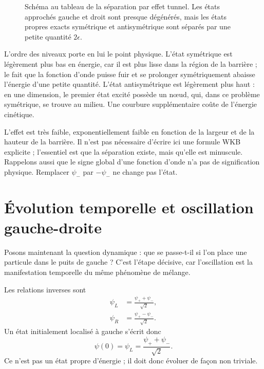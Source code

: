 \begin{figure}\centering
{}\caption{Schéma au tableau de la séparation par effet tunnel. Les états approchés gauche et droit sont presque dégénérés, mais les états propres exacts symétrique et antisymétrique sont séparés par une petite quantité \(2\epsilon\).}\end{figure}

L’ordre des niveaux porte en lui le point physique. L’état symétrique est légèrement plus bas en énergie, car il est plus lisse dans la région de la barrière ; le fait que la fonction d’onde puisse fuir et se prolonger symétriquement abaisse l’énergie d’une petite quantité. L’état antisymétrique est légèrement plus haut : en une dimension, le premier état excité possède un nœud, qui, dans ce problème symétrique, se trouve au milieu. Une courbure supplémentaire coûte de l’énergie cinétique.

L’effet est très faible, exponentiellement faible en fonction de la largeur et de la hauteur de la barrière. Il n’est pas nécessaire d’écrire ici une formule WKB explicite ; l’essentiel est que la séparation existe, mais qu’elle est minuscule. Rappelons aussi que le signe global d’une fonction d’onde n’a pas de signification physique. Remplacer \(\psi_-\) par \(-\psi_-\) ne change pas l’état.

\section{Évolution temporelle et oscillation gauche-droite}

Posons maintenant la question dynamique : que se passe-t-il si l’on place une particule dans le puits de gauche ? C’est l’étape décisive, car l’oscillation est la manifestation temporelle du même phénomène de mélange.

Les relations inverses sont \begin{align}
\psi_L &= \frac{\psi_+ + \psi_-}{\sqrt{2}},\\
\psi_R &= \frac{\psi_+ - \psi_-}{\sqrt{2}}.
\end{align}Un état initialement localisé à gauche s’écrit donc \begin{equation}
\psi(0)=\psi_L=\frac{\psi_+ + \psi_-}{\sqrt{2}}.
\end{equation}Ce n’est pas un état propre d’énergie ; il doit donc évoluer de façon non triviale.

